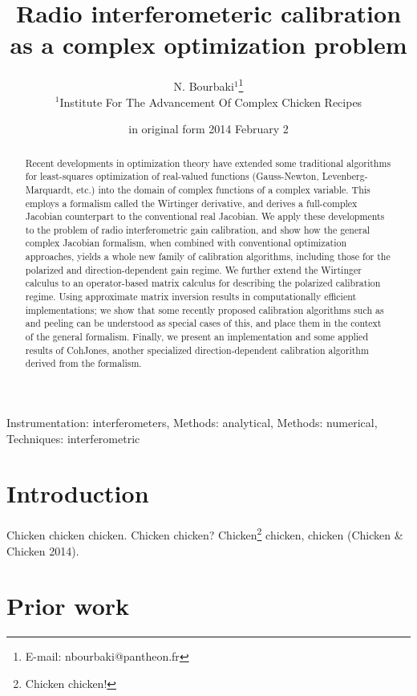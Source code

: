 \documentclass[useAMS,usenatbib]{mn2e}
\title[Radio interferometeric calibration as a complex optimization problem]{Radio interferometeric calibration as a complex optimization problem}
\author[N. Bourbaki]{N. Bourbaki$^1$\thanks{E-mail: nbourbaki@pantheon.fr}\\ 
$^1$Institute For The Advancement Of Complex Chicken Recipes}
\newcommand{\StefCal}{{\sc StefCal}}
\begin{document}
\date{in original form 2014 February 2}

\pagerange{\pageref{firstpage}--\pageref{lastpage}} 

\maketitle

\label{firstpage}

\begin{abstract}
Recent developments in optimization theory have extended some traditional algorithms for least-squares optimization of 
real-valued functions (Gauss-Newton, Levenberg-Marquardt, etc.) into the domain of complex functions of a complex variable. This
employs a formalism called the Wirtinger derivative, and derives a full-complex Jacobian counterpart to the conventional 
real Jacobian. We apply these developments to the problem of radio interferometric gain calibration, and show how the 
general complex Jacobian formalism, when combined with conventional optimization approaches, yields a whole new family 
of calibration algorithms, including those for the polarized and direction-dependent gain regime. We further extend the Wirtinger 
calculus to an operator-based matrix calculus for describing the polarized calibration regime. Using approximate matrix 
inversion results in computationally efficient implementations; we show that some recently proposed calibration algorithms 
such as {\sc \StefCal} and peeling can be understood as special cases of this, and place them in the context of the general 
formalism. Finally, we present an implementation and some applied results of {\sc CohJones}, another specialized 
direction-dependent calibration algorithm derived from the formalism.

\end{abstract}

\begin{keywords}
Instrumentation: interferometers, Methods: analytical, Methods: numerical, Techniques: interferometric
\end{keywords}

\section{Introduction}

Chicken chicken chicken. Chicken chicken? Chicken\footnote{Chicken chicken!} chicken, chicken (Chicken \& Chicken 2014).

\section{Prior work}
\end{document}
